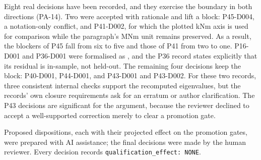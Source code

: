 Eight real decisions have been recorded, and they exercise the boundary in both directions (PA-14). Two were accepted with rationale and lift a block: P45-D004, a notation-only conflict, and P41-D002, for which the plotted kNm axis is used for comparison while the paragraph's MNm unit remains preserved. As a result, the blockers of P45 fall from six to five and those of P41 from two to one. P16-D001 and P36-D001 were formalised as , and the P36 record states explicitly that its residual is in-sample, not held-out. The remaining four decisions keep the block: P40-D001, P44-D001, and P43-D001 and P43-D002. For these two records, three consistent internal checks support the recomputed eigenvalues, but the records' own closure requirements ask for an erratum or author clarification. The P43 decisions are significant for the argument, because the reviewer declined to accept a well-supported correction merely to clear a promotion gate.

{ 
Proposed dispositions, each with their projected effect on the promotion gates, were prepared with AI assistance; the final decisions were made by the human reviewer. Every decision records \texttt{qualification\_effect: NONE}.\par}
